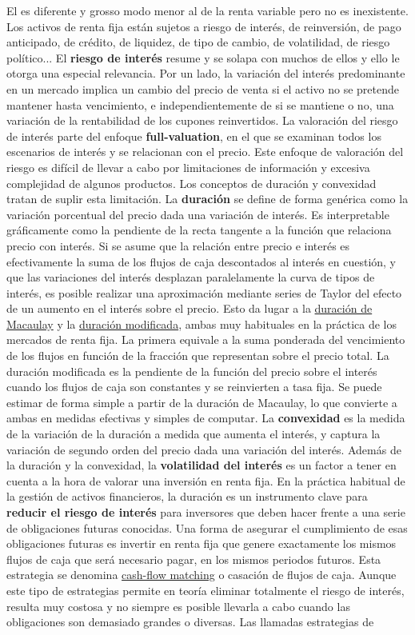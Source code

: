 \documentclass{nuevotema}
\begin{document}
El  es diferente y grosso modo menor al de la renta variable pero no es inexistente. Los activos de renta fija están sujetos a riesgo de interés, de reinversión, de pago anticipado, de crédito, de liquidez, de tipo de cambio, de volatilidad, de riesgo político... El \textbf{riesgo de interés} resume y se solapa con muchos de ellos y ello le otorga una especial relevancia. Por un lado, la variación del interés predominante en un mercado implica un cambio del precio de venta si el activo no se pretende mantener hasta vencimiento, e independientemente de si se mantiene o no, una variación de la rentabilidad de los cupones reinvertidos. La valoración del riesgo de interés parte del enfoque \textbf{full-valuation}, en el que se examinan todos los escenarios de interés y se relacionan con el precio. Este enfoque de valoración del riesgo es difícil de llevar a cabo por limitaciones de información y excesiva complejidad de algunos productos. Los conceptos de duración y convexidad tratan de suplir esta limitación. La \textbf{duración} se define de forma genérica como la variación porcentual del precio dada una variación de interés. Es interpretable gráficamente como la pendiente de la recta tangente a la función que relaciona precio con interés. Si se asume que la relación entre precio e interés es efectivamente la suma de los flujos de caja descontados al interés en cuestión, y que las variaciones del interés desplazan paralelamente la curva de tipos de interés, es posible realizar una aproximación mediante series de Taylor del efecto de un aumento en el interés sobre el precio. Esto da lugar a la \underline{duración de Macaulay} y la \underline{duración modificada}, ambas muy habituales en la práctica de los mercados de renta fija. La primera equivale a la suma ponderada del vencimiento de los flujos en función de la fracción que representan sobre el precio total. La duración modificada es la pendiente de la función del precio sobre el interés cuando los flujos de caja son constantes y se reinvierten a tasa fija. Se puede estimar de forma simple a partir de la duración de Macaulay, lo que convierte a ambas en medidas efectivas y simples de computar. La \textbf{convexidad} es la medida de la variación de la duración a medida que aumenta el interés, y captura la variación de segundo orden del precio dada una variación del interés. Además de la duración y la convexidad, la \textbf{volatilidad del interés} es un factor a tener en cuenta a la hora de valorar una inversión en renta fija. En la práctica habitual de la gestión de activos financieros, la duración es un instrumento clave para \textbf{reducir el riesgo de interés} para inversores que deben hacer frente a una serie de obligaciones futuras conocidas. Una forma de asegurar el cumplimiento de esas obligaciones futuras es invertir en renta fija que genere exactamente los mismos flujos de caja que será necesario pagar, en los mismos periodos futuros. Esta estrategia se denomina \underline{cash-flow matching} o casación de flujos de caja. Aunque este tipo de estrategias permite en teoría eliminar totalmente el riesgo de interés, resulta muy costosa y no siempre es posible llevarla a cabo cuando las obligaciones son demasiado grandes o diversas. Las llamadas estrategias de 
\end{document}
